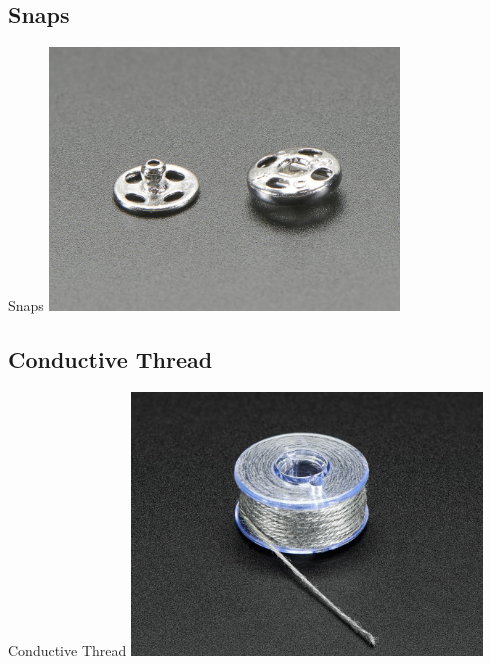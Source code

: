 \documentclass[aspectratio=169]{beamer}
\begin{document}
\subsection{Snaps}
\begin{frame}[fragile]{Snaps}
\includegraphics[height=2.75in]{snap.jpg}
\end{frame}
\subsection{Conductive Thread}
\begin{frame}[fragile]{Conductive Thread}
\includegraphics[height=2.75in]{conductivethread.jpg}
\end{frame}
\end{document}
